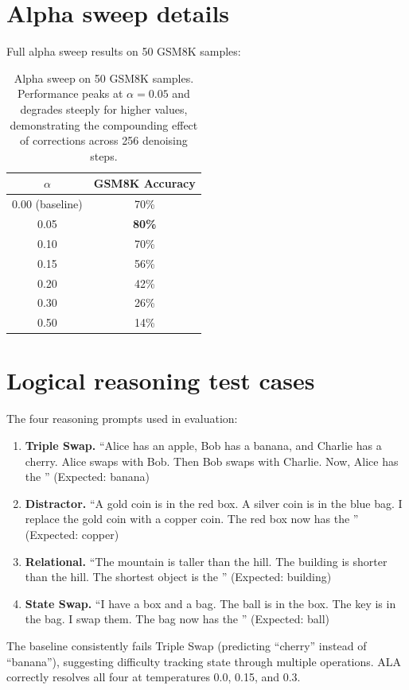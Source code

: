 \documentclass{article} %
\begin{document}
\section{Alpha sweep details}
\label{app:alpha}

Full alpha sweep results on 50 GSM8K samples:

\begin{table}[h]
\begin{center}
\begin{tabular}{cc}
\toprule
$\alpha$ & GSM8K Accuracy \\
\midrule
0.00 (baseline) & 70\% \\
0.05 & \textbf{80\%} \\
0.10 & 70\% \\
0.15 & 56\% \\
0.20 & 42\% \\
0.30 & 26\% \\
0.50 & 14\% \\
\bottomrule
\end{tabular}
\end{center}
\caption{Alpha sweep on 50 GSM8K samples. Performance peaks at $\alpha{=}0.05$ and degrades steeply for higher values, demonstrating the compounding effect of corrections across 256 denoising steps.}\label{tab:alpha}
\end{table}


\section{Logical reasoning test cases}
\label{app:logic}

The four reasoning prompts used in evaluation:

\begin{enumerate}
    \item \textbf{Triple Swap.} ``Alice has an apple, Bob has a banana, and Charlie has a cherry. Alice swaps with Bob. Then Bob swaps with Charlie. Now, Alice has the \underline{\hspace{1cm}}'' (Expected: banana)
    \item \textbf{Distractor.} ``A gold coin is in the red box. A silver coin is in the blue bag. I replace the gold coin with a copper coin. The red box now has the \underline{\hspace{1cm}}'' (Expected: copper)
    \item \textbf{Relational.} ``The mountain is taller than the hill. The building is shorter than the hill. The shortest object is the \underline{\hspace{1cm}}'' (Expected: building)
    \item \textbf{State Swap.} ``I have a box and a bag. The ball is in the box. The key is in the bag. I swap them. The bag now has the \underline{\hspace{1cm}}'' (Expected: ball)
\end{enumerate}

The baseline consistently fails Triple Swap (predicting ``cherry'' instead of ``banana''), suggesting difficulty tracking state through multiple operations.
ALA correctly resolves all four at temperatures 0.0, 0.15, and 0.3.
\end{document}

